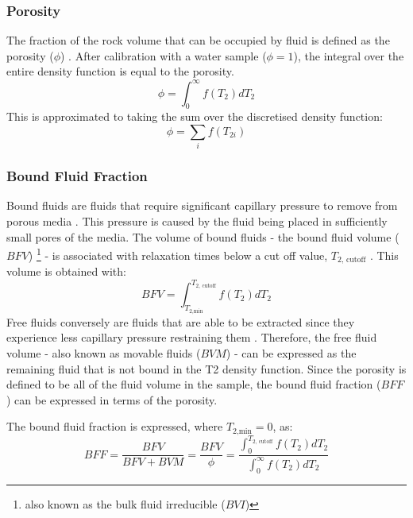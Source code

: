 \subsubsection{Porosity}
The fraction of the rock volume that can be occupied by fluid is defined as the porosity ($\phi$) \cite{PorosityandT2Times}. After calibration with a water sample ($\phi = 1$), the integral over the entire density function is equal to the porosity.
\begin{equation}
    \phi = \int_0^\infty f(T_{2}) dT_{2}
\end{equation}
This is approximated to taking the sum over the discretised density function:
\begin{equation}
    \phi = \sum_i f(T_{2 i})
\end{equation}

\subsubsection{Bound Fluid Fraction}
Bound fluids are fluids that require significant capillary pressure to remove from porous media \cite{wellLoggingBook}. This pressure is caused by the fluid being placed in sufficiently small pores of the media. The volume of bound fluids - the bound fluid volume ($BFV$) \footnote{also known as the bulk fluid irreducible ($BVI$)} - is associated with relaxation times below a cut off value, $T_{2 \text{, cutoff}}$ \cite{wellLoggingBook}. This volume is obtained with:
\begin{equation}
    BFV = \int^{T_{2\text{, cutoff}}}_{T_{2\text{,min}}} f(T_2) d T_2
    \label{eq:boundFluidVolume}
\end{equation}
Free fluids conversely are fluids that are able to be extracted since they experience less capillary pressure restraining them \cite{NMRForRockskleinberg1993nuclear}\cite{BoundfluidFractionchen1998improving}. Therefore, the free fluid volume - also known as movable fluids ($BVM$) - can be expressed as the remaining fluid that is not bound in the T2 density function. Since the porosity is defined to be all of the fluid volume in the sample, the bound fluid fraction ($BFF$) can be expressed in terms of the porosity. 

The bound fluid fraction is expressed, where $T_{2\text{,min}} = 0$, as:
\begin{equation}
    BFF = 
    \frac{BFV}{BFV + BVM} =
    \frac{BFV}{\phi} = \frac{\int^{T_{2\text{, cutoff}}}_{0} f(T_2) d T_2}{\int_0^\infty f(T_{2}) dT_{2}}
    \label{eq:boundFluidFraction}
\end{equation}

